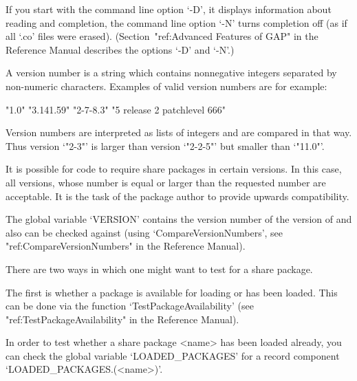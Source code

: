 If you start {\GAP} with the command line option `-D', it displays
information about reading and completion, the command line option `-N' turns
completion off (as if all `.co' files were erased).
(Section~"ref:Advanced Features of GAP" in the Reference Manual describes the
options `-D' and `-N'.)


A version number is a string which contains nonnegative integers separated
by non-numeric characters. Examples of valid version numbers are for
example:

\begintt
"1.0"   "3.141.59"  "2-7-8.3" "5 release 2 patchlevel 666"
\endtt

Version numbers are interpreted as lists of integers and are compared in
that way. Thus version `"2-3"' is larger than version `"2-2-5"' but smaller
than `"11.0"'.

It is possible for code to require share packages in certain versions. In
this case, all versions, whose number is equal or larger than the requested
number are acceptable. It is the task of the package author to provide
upwards compatibility.

The global variable `VERSION' contains the version number of the version of
{\GAP} and also can be checked against (using `CompareVersionNumbers', see
"ref:CompareVersionNumbers" in the Reference Manual).



There are two ways in which one might want to test for a share package. 

The first is whether a package is available for loading or has been loaded.
This can be done via the function `TestPackageAvailability' (see
"ref:TestPackageAvailability" in the Reference Manual). 

In order to test whether a share package <name> has been loaded already, you
can check the global variable `LOADED_PACKAGES' for a record component
`LOADED_PACKAGES.(<name>)'.


